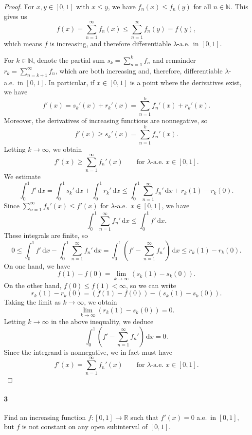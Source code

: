 \documentclass[12pt]{article}
\newlength{\myparskip}
\newenvironment{fullbox}{\begin{lrbox}{\savefullbox}\begin{minipage}{\dimexpr\textwidth-2\fboxsep\relax}\setlength{\parskip}{\myparskip}}{\end{minipage}\end{lrbox}\framebox[\textwidth]{\usebox{\savefullbox}}}
\newenvironment{pbox}[1][]{\begin{fullbox}\ifx#1\empty\else\paragraph{#1}\phantom{}\fi}{\end{fullbox}}
\theoremstyle{definition}
\newcommand{\N}{\mathbb{N}}
\newcommand{\R}{\mathbb{R}}
\newcommand{\<}{\langle}
\renewcommand{\>}{\rangle}
\newcommand{\dd}{\,\mathrm{d}}
\begin{document}
\begin{proof}
    For $x, y \in [0, 1]$ with $x \leq y$, we have $f_n(x) \leq f_n(y)$ for all $n \in \mathbb{N}$.
    This gives us
    \[
        f(x) = \sum_{n=1}^{\infty} f_n(x) \leq \sum_{n=1}^{\infty} f_n(y) = f(y),
    \]
    which means $f$ is increasing, and therefore differentiable $\lambda$-a.e.\ in $[0, 1]$.

    For $k \in \N$, denote the partial sum $s_k = \sum_{n=1}^{k} f_n$ and remainder $r_k = \sum_{n=k+1}^{\infty} f_n$, which are both increasing and, therefore, differentiable $\lambda$-a.e.\ in $[0, 1]$.
    In particular, if $x \in [0, 1]$ is a point where the derivatives exist, we have
    \[
        f'(x) = s_k'(x) + r_k'(x) = \sum_{n=1}^{k} f_n'(x) + r_k'(x).
    \]
    Moreover, the derivatives of increasing functions are nonnegative, so
    \[
        f'(x) \geq s_k'(x) = \sum_{n=1}^{k} f_n'(x).
    \]
    Letting $k \to \infty$, we obtain
    \[
        f'(x) \geq \sum_{n=1}^{\infty} f_n'(x) \qquad \text{for $\lambda$-a.e.\ $x \in [0, 1]$.}
    \]
    We estimate
    \[
        \int_{0}^{1} f' \dd{x}
            = \int_{0}^{1} s_k' \dd{x} + \int_{0}^{1} r_k' \dd{x}
            \leq \int_{0}^{1} \sum_{n=1}^{\infty} f_n'  \dd{x} + r_k(1) - r_k(0).
    \]
    Since $\sum_{n=1}^{\infty} f_n'(x) \leq f'(x)$ for $\lambda$-a.e.\ $x \in [0, 1]$, we have
    \[
        \int_{0}^{1} \sum_{n=1}^{\infty} f_n' \dd{x} \leq \int_{0}^{1} f' \dd{x}.
    \]
    These integrals are finite, so
    \[
        0 
            \leq \int_{0}^{1} f' \dd{x} - \int_{0}^{1} \sum_{n=1}^{\infty} f_n' \dd{x}
            = \int_{0}^{1} \left(f' - \sum_{n=1}^{\infty} f_n' \right) \dd{x}
            \leq r_k(1) - r_k(0).
    \]
    On one hand, we have
    \[
        f(1) - f(0) = \lim_{k \to \infty} (s_k(1) - s_k(0)).
    \]
    On the other hand, $f(0) \leq f(1) < \infty$, so we can write
    \[
        r_k(1) - r_k(0) = (f(1) - f(0)) - (s_k(1) - s_k(0)).
    \]
    Taking the limit as $k \to \infty$, we obtain
    \[
        \lim_{k \to \infty} (r_k(1) - s_k(0)) = 0.
    \]
    Letting $k \to \infty$ in the above inequality, we deduce
    \[
        \int_{0}^{1} \left(f' - \sum_{n=1}^{\infty} f_n' \right) \dd{x} = 0.
    \]
    Since the integrand is nonnegative, we in fact must have
    \[
        f'(x) = \sum_{n=1}^{\infty} f_n'(x) \qquad \text{for $\lambda$-a.e.\ $x \in [0, 1]$.}
    \]
\end{proof}

\newpage
\begin{pbox}[3]
    Find an increasing function $f : [0, 1] \to \R$ such that $f'(x) = 0$ a.e.\ in $[0, 1]$, but $f$ is not constant on any open subinterval of $[0, 1]$.
\end{pbox}
\end{document}
